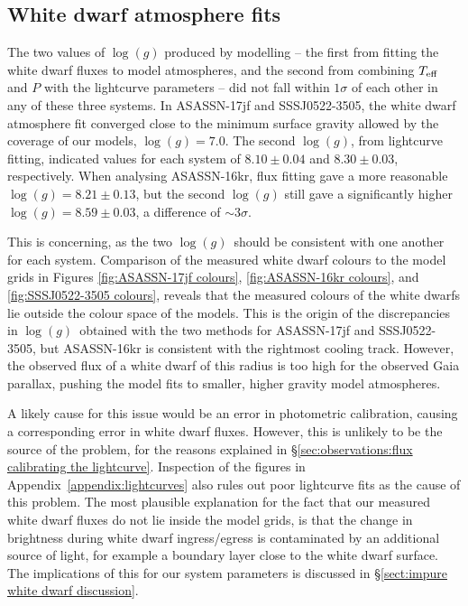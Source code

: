\subsection{White dwarf atmosphere fits}
\label{sect:three white dwarfs:method WD atmosphere fits}

The two values of $\log (g)$ produced by modelling -- the first from fitting the white dwarf fluxes to model atmospheres, and the second from combining $T_{\rm eff}$ and $P$ with the lightcurve parameters -- did not fall within $1\sigma$ of each other in any of these three systems.
In ASASSN-17jf and SSSJ0522-3505, the white dwarf atmosphere fit converged close to the minimum surface gravity allowed by the coverage of our models, $\log(g) = 7.0$.
The second $\log (g)$, from lightcurve fitting, indicated values for each system of $8.10\pm0.04$ and $8.30\pm0.03$, respectively.
When analysing ASASSN-16kr, flux fitting gave a more reasonable $\log(g)=8.21\pm0.13$, but the second $\log (g)$ still gave a significantly higher $\log(g)=8.59\pm0.03$, a difference of $\sim3\sigma$.

This is concerning, as the two $\log (g)$\ should be consistent with one another for each system.
Comparison of the measured white dwarf colours to the \citet{Bergeron1995} model grids in Figures \ref{fig:ASASSN-17jf colours}, \ref{fig:ASASSN-16kr colours}, and \ref{fig:SSSJ0522-3505 colours}, reveals that the measured colours of the white dwarfs lie outside the colour space of the models. This is the origin of the discrepancies in $\log (g)$\ obtained with the two methods for ASASSN-17jf and SSSJ0522-3505, but ASASSN-16kr is consistent with the rightmost cooling track. However, the observed flux of a white dwarf of this radius is too high for the observed Gaia parallax, pushing the model fits to smaller, higher gravity model atmospheres.

A likely cause for this issue would be an error in photometric calibration, causing a corresponding error in white dwarf fluxes. However, this is unlikely to be the source of the problem, for the reasons explained in \S\ref{sec:observations:flux calibrating the lightcurve}.
Inspection of the figures in Appendix~\ref{appendix:lightcurves} also rules out poor lightcurve fits as the cause of this problem. The most plausible explanation for the fact that our measured white dwarf fluxes do not lie inside the model grids, is that the change in brightness during white dwarf ingress/egress is contaminated by an additional source of light, for example a boundary layer close to the white dwarf surface. The implications of this for our system parameters is discussed in \S\ref{sect:impure white dwarf discussion}.

